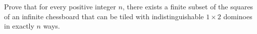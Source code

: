 Prove that for every positive integer $n$,
there exists a finite subset of the squares of an infinite chessboard that can be tiled with
indistinguishable $1\times 2$ dominoes in exactly $n$ ways.
